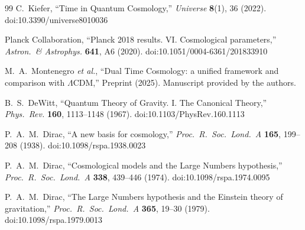 \documentclass[12pt]{article}
\begin{document}
\begin{thebibliography}{99}
C.~Kiefer,
``Time in Quantum Cosmology,''
\textit{Universe} \textbf{8}(1), 36 (2022).
doi:10.3390/universe8010036

Planck Collaboration,
``Planck 2018 results. VI. Cosmological parameters,''
\textit{Astron.\ \& Astrophys.} \textbf{641}, A6 (2020).
doi:10.1051/0004-6361/201833910

M.~A.~Montenegro \textit{et al.},
``Dual Time Cosmology: a unified framework and comparison with $\Lambda$CDM,''
Preprint (2025). Manuscript provided by the authors.

B.~S.~DeWitt,
``Quantum Theory of Gravity. I. The Canonical Theory,''
\textit{Phys.\ Rev.} \textbf{160}, 1113--1148 (1967).
doi:10.1103/PhysRev.160.1113



P.~A.~M.~Dirac,
``A new basis for cosmology,''
\textit{Proc.\ R.\ Soc.\ Lond.\ A} \textbf{165}, 199--208 (1938).
doi:10.1098/rspa.1938.0023

P.~A.~M.~Dirac,
``Cosmological models and the Large Numbers hypothesis,''
\textit{Proc.\ R.\ Soc.\ Lond.\ A} \textbf{338}, 439--446 (1974).
doi:10.1098/rspa.1974.0095

P.~A.~M.~Dirac,
``The Large Numbers hypothesis and the Einstein theory of gravitation,''
\textit{Proc.\ R.\ Soc.\ Lond.\ A} \textbf{365}, 19--30 (1979).
doi:10.1098/rspa.1979.0013

\end{thebibliography}
\end{document}
